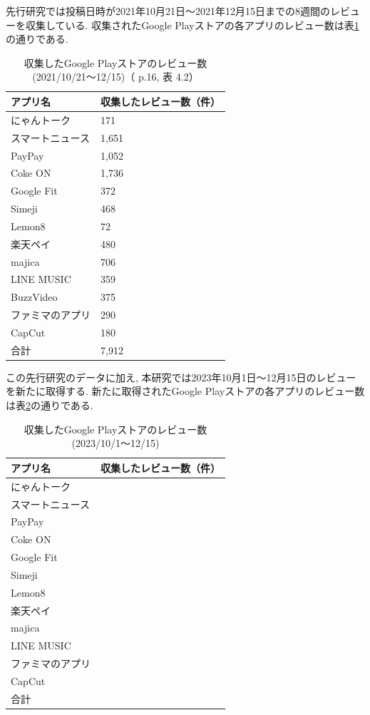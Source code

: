 先行研究では投稿日時が2021年10月21日〜2021年12月15日までの8週間のレビューを収集している. 収集されたGoogle Playストアの各アプリのレビュー数は表\ref{tb:rawreviewnum}の通りである. 
\begin{table}[htbp]
  \caption{収集したGoogle Playストアのレビュー数(2021/10/21〜12/15)（\cite{kawatsura} p.16, 表 4.2）}
  \label{tb:rawreviewnum}
  \begin{center}
  \begin{tabular}{l|l}
    \hline
    アプリ名&収集したレビュー数（件）\\\hline\hline
    にゃんトーク&171\\\hline
    スマートニュース&1,651\\\hline
    PayPay&1,052\\\hline
    Coke ON&1,736\\\hline
    Google Fit&372\\\hline
    Simeji&468\\\hline
    Lemon8&72\\\hline
    楽天ペイ&480\\\hline
    majica&706\\\hline
    LINE MUSIC&359\\\hline
    BuzzVideo&375\\\hline
    ファミマのアプリ&290\\\hline
    CapCut&180\\\hline\hline
    合計&7,912
  \end{tabular}\end{center}
\end{table}

この先行研究のデータに加え, 本研究では2023年10月1日〜12月15日のレビューを新たに取得する. 新たに取得されたGoogle Playストアの各アプリのレビュー数は表\ref{tb:rawreviewnum2023}の通りである. 
\begin{table}[htbp]
  \caption{収集したGoogle Playストアのレビュー数(2023/10/1〜12/15)}
  \label{tb:rawreviewnum2023}
  \begin{center}
  \begin{tabular}{l|l}
    \hline
    アプリ名&収集したレビュー数（件）\\\hline\hline
    にゃんトーク&\\\hline
    スマートニュース&\\\hline
    PayPay&\\\hline
    Coke ON&\\\hline
    Google Fit&\\\hline
    Simeji&\\\hline
    Lemon8&\\\hline
    楽天ペイ&\\\hline
    majica&\\\hline
    LINE MUSIC&\\\hline
    ファミマのアプリ&\\\hline
    CapCut&\\\hline\hline
    合計&
  \end{tabular}\end{center}
\end{table}


